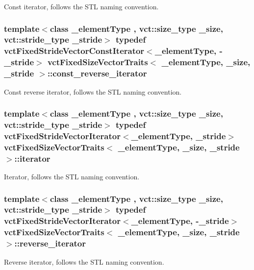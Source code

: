 Const iterator, follows the S\-T\-L naming convention. \hypertarget{classvct_fixed_size_vector_traits_a66365350e5fae26c9cf29a3ce0bb4a60}{
\subsubsection[{const\-\_\-reverse\-\_\-iterator}]{\setlength{\rightskip}{0pt plus 5cm}template$<$class \-\_\-element\-Type , vct\-::size\-\_\-type \-\_\-size, vct\-::stride\-\_\-type \-\_\-stride$>$ typedef {\bf vct\-Fixed\-Stride\-Vector\-Const\-Iterator}$<$\-\_\-element\-Type, -\/\-\_\-stride$>$ {\bf vct\-Fixed\-Size\-Vector\-Traits}$<$ \-\_\-element\-Type, \-\_\-size, \-\_\-stride $>$\-::{\bf const\-\_\-reverse\-\_\-iterator}}}\label{classvct_fixed_size_vector_traits_a66365350e5fae26c9cf29a3ce0bb4a60}
Const reverse iterator, follows the S\-T\-L naming convention. \hypertarget{classvct_fixed_size_vector_traits_a4c4cff693ac7f81edfb240a208506309}{
\subsubsection[{iterator}]{\setlength{\rightskip}{0pt plus 5cm}template$<$class \-\_\-element\-Type , vct\-::size\-\_\-type \-\_\-size, vct\-::stride\-\_\-type \-\_\-stride$>$ typedef {\bf vct\-Fixed\-Stride\-Vector\-Iterator}$<$\-\_\-element\-Type, \-\_\-stride$>$ {\bf vct\-Fixed\-Size\-Vector\-Traits}$<$ \-\_\-element\-Type, \-\_\-size, \-\_\-stride $>$\-::{\bf iterator}}}\label{classvct_fixed_size_vector_traits_a4c4cff693ac7f81edfb240a208506309}
Iterator, follows the S\-T\-L naming convention. \hypertarget{classvct_fixed_size_vector_traits_a46a61657ee7bece7277e0b59c4e0ea41}{
\subsubsection[{reverse\-\_\-iterator}]{\setlength{\rightskip}{0pt plus 5cm}template$<$class \-\_\-element\-Type , vct\-::size\-\_\-type \-\_\-size, vct\-::stride\-\_\-type \-\_\-stride$>$ typedef {\bf vct\-Fixed\-Stride\-Vector\-Iterator}$<$\-\_\-element\-Type, -\/\-\_\-stride$>$ {\bf vct\-Fixed\-Size\-Vector\-Traits}$<$ \-\_\-element\-Type, \-\_\-size, \-\_\-stride $>$\-::{\bf reverse\-\_\-iterator}}}\label{classvct_fixed_size_vector_traits_a46a61657ee7bece7277e0b59c4e0ea41}
Reverse iterator, follows the S\-T\-L naming convention. 

